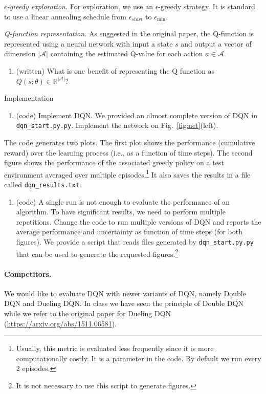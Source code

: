 \documentclass[a4paper]{article}
\begin{document}
\vspace{.2in}
\emph{$\epsilon$-greedy exploration.} For exploration, we use an $\epsilon$-greedy strategy. It is standard to use a linear annealing schedule from $\epsilon_{start}$ to $\epsilon_{\min}$.

\vspace{.2in}
\emph{Q-function representation.} As suggested in the original paper, the Q-function is represented using a neural network with input a state $s$ and output a vector of dimension $|\mathcal{A}|$ containing the estimated Q-value for each action $a \in \mathcal{A}$.
\begin{enumerate}
    \item (written) What is one benefit of representing the Q function as $Q(s; \theta) \in \mathbb{R}^{|\mathcal{A}|}$?
\end{enumerate}

Implementation
\begin{enumerate}
    \item (code) Implement DQN. We provided an almost complete version of DQN in \texttt{dqn\_start.py.py}.
    Implement the network on Fig.~\ref{fig:net}(left).
\end{enumerate}
The code generates two plots. The first plot shows the performance (cumulative reward) over the learning process (i.e., as a function of time steps). The second figure shows the performance of the associated greedy policy on a test environment averaged over multiple episodes.\footnote{Usually, this metric is evaluated less frequently since it is more computationally costly. It is a parameter in the code. By default we run every 2 episodes.} It also saves the results in a file called \texttt{dqn\_results.txt}.
\begin{enumerate}
    \item (code) A single run is not enough to evaluate the performance of an algorithm. To have significant results, we need to perform multiple repetitions. Change the code to run multiple versions of DQN and reports the average performance and uncertainty as function of time steps (for both figures). We provide a script that reads files generated by \texttt{dqn\_start.py.py} that can be used to generate the requested figures.\footnote{It is not necessary to use this script to generate figures.}
\end{enumerate}

\paragraph{Competitors.} We would like to evaluate DQN with newer variants of DQN, namely Double DQN and Dueling DQN.
In class we have seen the principle of Double DQN while we refer to the original paper for Dueling DQN (\url{https://arxiv.org/abs/1511.06581}).
\end{document}
